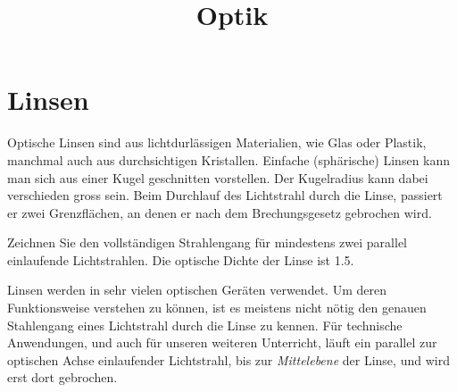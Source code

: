 \documentclass[12pt,a4paper,twoside]{article}
\date{}
\title{Optik}
\begin{document}

\addtocounter{section}{7}
\addtocounter{aufgabe}{23}


\section{Linsen}

Optische Linsen sind aus lichtdurlässigen Materialien, wie Glas oder Plastik, manchmal auch aus durchsichtigen Kristallen.
Einfache (sphärische) Linsen kann man sich aus einer Kugel geschnitten vorstellen. Der Kugelradius kann dabei verschieden gross sein.
Beim Durchlauf des Lichtstrahl durch die Linse, passiert er zwei Grenzflächen, an denen er nach dem Brechungsgesetz gebrochen wird.

\begin{aufgabe}
Zeichnen Sie den vollständigen Strahlengang für mindestens zwei parallel einlaufende Lichtstrahlen.
Die optische Dichte der Linse ist \num{1.5}.
\end{aufgabe}

\begin{center}
\end{center}


Linsen werden in sehr vielen optischen Geräten verwendet. Um deren Funktionsweise verstehen zu können, ist es meistens nicht
nötig den genauen Stahlengang eines Lichtstrahl durch die Linse zu kennen. Für technische Anwendungen, und auch für unseren weiteren
Unterricht, läuft ein parallel zur optischen Achse einlaufender Lichtstrahl, bis zur \emph{Mittelebene} der Linse, und wird erst dort gebrochen.
\end{document}
